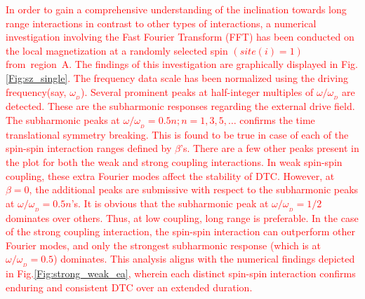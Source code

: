 \documentclass[%
nofootinbib,
reprint,
superscriptaddress,
amsmath,amssymb,showkeys,
aps,
prb,
]{revtex4-2}
\newcommand{\red}[1]{\textcolor{red}{#1}}
\begin{document}
\red{ In order to gain a comprehensive understanding of the inclination towards long range interactions in contrast to other types of interactions, a numerical investigation involving the Fast Fourier Transform (FFT) has been conducted on the local magnetization at a randomly selected spin $(site(i)=1)$ from region A. The findings of this investigation are graphically displayed in Fig.\ref{Fig:sz_single}. The frequency data scale has been normalized using the driving frequency(say, $\omega_{_{D}}$). Several prominent peaks at half-integer multiples of $\omega/\omega_{_{D}}$ are detected. These are the subharmonic responses regarding the external drive field. The subharmonic peaks at $\omega/\omega_{_{D}} = 0.5n; n= 1, 3, 5,\dots$ confirms the time translational symmetry breaking. This is found to be true in case of each of the spin-spin interaction ranges defined by $\beta$'s. There are a few other peaks present in the plot for both the weak and strong coupling interactions. In weak spin-spin coupling, these extra Fourier modes affect the stability of DTC. However, at $\beta=0$, the additional peaks are submissive with respect to the subharmonic peaks at $\omega/\omega_{_{D}}=0.5 n$'s. It is obvious that the subharmonic peak at $\omega/\omega_{_{D}}=1/2$ dominates over others. Thus, at low coupling, long range is preferable. In the case of the strong coupling interaction, the spin-spin interaction can outperform other Fourier modes, and only the strongest subharmonic response (which is at $\omega/\omega_{_{D}} = 0.5$) dominates. This analysis aligns with the numerical findings depicted in Fig.\ref{Fig:strong_weak_ea}, wherein each distinct spin-spin interaction confirms enduring and consistent DTC over an extended duration.}
\end{document}
